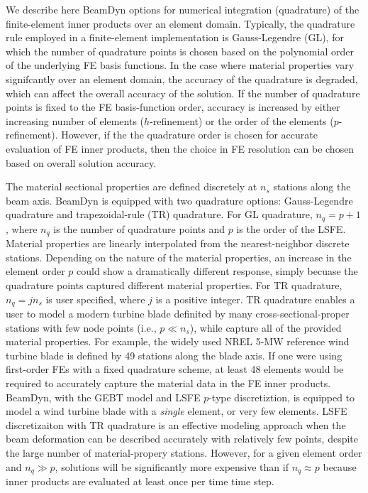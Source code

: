 \documentclass{aiaa-tc}
\begin{document}
We describe here BeamDyn options for numerical integration (quadrature) of the finite-element inner products over an element domain.   
Typically, the quadrature rule employed in a finite-element implementation is Gauss-Legendre (GL), for which the number of quadrature points is chosen based on the polynomial order of the underlying FE basis functions.  
In the case where material properties vary signifcantly over an element domain, the accuracy of the quadrature is degraded, which can affect the overall accuracy of the solution.   If the number of quadrature points is fixed to the FE basis-function order, accuracy is increased by either increasing number of elements ($h$-refinement) or the order of the elements ($p$-refinement).  However, if the the quadrature order is chosen for accurate evaluation of FE inner products, then the choice in FE resolution can be chosen based on overall solution accuracy.

The material sectional properties are defined discretely at $n_s$ stations along the beam axis.
BeamDyn is equipped with two quadrature options: Gauss-Legendre quadrature and trapezoidal-rule (TR) quadrature.  
For GL quadrature, $n_q= p + 1$, where $n_q$ is the number of quadrature points and $p$ is the order of the LSFE.  Material properties are linearly interpolated from the nearest-neighbor discrete stations. 
Depending on the nature of the material properties, an increase in the element order $p$ could show a dramatically different response, simply becuase the quadrature points captured different material properties.
For TR quadrature, $n_q = j n_s$ is user specified, where $j$ is a positive integer. 
TR quadrature enables a user to model a modern turbine blade definited by many cross-sectional-proper stations with few node points (i.e., $p \ll n_s$), while capture all of the provided material properties.
For example, 
the widely used NREL 5-MW reference wind turbine blade is defined by 49 stations along the blade axis.   If one were using first-order FEs with a fixed quadrature scheme, at least 48 elements would be required to accurately capture the material data in the FE inner products.
BeamDyn, with the GEBT model and LSFE $p$-type discretiztion, is equipped to model a wind turbine blade with a \textit{single} element, or very few elements.  
LSFE discretizaiton with TR quadrature 
is an effective modeling approach when the beam deformation can be described accurately with relatively few points, despite the large number of material-propery stations.    However, for a given element order and $n_q \gg p$, solutions will be significantly more expensive than if $n_q \approx p$ because inner products are evaluated at least once per time time step. 
\end{document}
